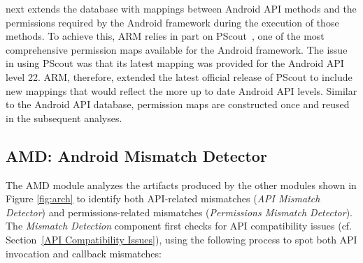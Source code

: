  \@approach next extends the database with mappings between Android API methods and the permissions required by the Android framework during the execution of those methods. To achieve this, ARM relies in part on PScout~\cite{au2012pscout}, one of the most comprehensive permission maps available for the Android framework. The issue in using PScout was that its latest mapping was provided for the Android API level 22. ARM, therefore, extended the latest official release of PScout to include new mappings that would reflect the more up to date Android API levels. Similar to the Android API database, permission maps are constructed once and reused in the subsequent analyses.
 

  

\begin{figure}[t!]%
        
        \vspace{-0.7cm}
\end{figure}


 
 
\subsection{AMD: Android Mismatch Detector} 
\label{mismatchdetection}

The AMD module analyzes the artifacts
produced by the other modules shown in Figure \ref{fig:arch} to identify both
API-related mismatches ({\it API Mismatch Detector}) and permissions-related
mismatches ({\it Permissions Mismatch
Detector}).
The \textit{Mismatch Detection} component first checks for API compatibility issues (cf.
Section~\ref{API Compatibility Issues}), using the following process to spot both
API invocation and callback mismatches:
 

